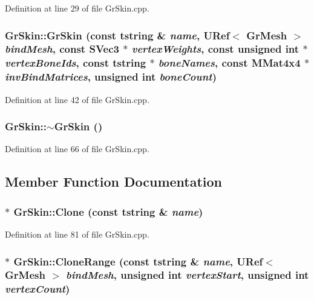 Definition at line 29 of file GrSkin.cpp.\hypertarget{class_gr_skin_587b2544a711c849a438fda54e6f7b54}{
\subsubsection[{GrSkin}]{\setlength{\rightskip}{0pt plus 5cm}GrSkin::GrSkin (const {\bf tstring} \& {\em name}, \/  {\bf URef}$<$ {\bf GrMesh} $>$ {\em bindMesh}, \/  const {\bf SVec3} $\ast$ {\em vertexWeights}, \/  const unsigned int $\ast$ {\em vertexBoneIds}, \/  const {\bf tstring} $\ast$ {\em boneNames}, \/  const {\bf MMat4x4} $\ast$ {\em invBindMatrices}, \/  unsigned int {\em boneCount})}}
\label{class_gr_skin_587b2544a711c849a438fda54e6f7b54}




Definition at line 42 of file GrSkin.cpp.\hypertarget{class_gr_skin_749fafea18281ab2f4d81bd3ce5a2771}{
\subsubsection[{$\sim$GrSkin}]{\setlength{\rightskip}{0pt plus 5cm}GrSkin::$\sim$GrSkin ()}}
\label{class_gr_skin_749fafea18281ab2f4d81bd3ce5a2771}




Definition at line 66 of file GrSkin.cpp.

\subsection{Member Function Documentation}
\hypertarget{class_gr_skin_e800b5edb89326aa2a88dca02719d2a0}{
\subsubsection[{Clone}]{ $\ast$ GrSkin::Clone (const {\bf tstring} \& {\em name})}}
\label{class_gr_skin_e800b5edb89326aa2a88dca02719d2a0}




Definition at line 81 of file GrSkin.cpp.\hypertarget{class_gr_skin_871be992c64f440b7281cc5792221477}{
\subsubsection[{CloneRange}]{ $\ast$ GrSkin::CloneRange (const {\bf tstring} \& {\em name}, \/  {\bf URef}$<$ {\bf GrMesh} $>$ {\em bindMesh}, \/  unsigned int {\em vertexStart}, \/  unsigned int {\em vertexCount})}}
\label{class_gr_skin_871be992c64f440b7281cc5792221477}




